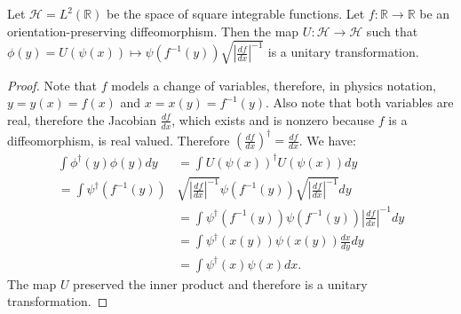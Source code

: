 \documentclass[10pt,twocolumn, nofootinbib]{revtex4-2}
\begin{document}
\begin{prop}
	Let $\mathcal{H} = L^2(\mathbb{R})$ be the space of square integrable functions. Let $f : \mathbb{R} \to \mathbb{R}$ be an orientation-preserving diffeomorphism. Then the map $U : \mathcal{H} \to \mathcal{H}$ such that 
	$\phi(y) = U(\psi(x)) \mapsto \psi(f^{-1}(y)) \sqrt{\left|\frac{df}{dx}\right|^{-1}}$ is a unitary transformation.
\end{prop}
\begin{proof}
	Note that $f$ models a change of variables, therefore, in physics notation, $y = y(x) = f(x)$ and $x = x(y) = f^{-1}(y)$. Also note that both variables are real, therefore the Jacobian $\frac{df}{dx}$, which exists and  is nonzero because $f$ is a diffeomorphism, is real valued. Therefore $\left(\frac{df}{dx}\right)^\dagger = \frac{df}{dx}$. We have:
	\begin{equation}
		\begin{aligned}
			\int \phi^\dagger(y) \phi(y) dy &= \int U(\psi(x))^\dagger U(\psi(x)) dy \\
			 = \int \psi^\dagger(f^{-1}(y)) &\sqrt{\left|\frac{df}{dx}\right|^{-1}}\psi(f^{-1}(y)) \sqrt{\left|\frac{df}{dx}\right|^{-1}} dy \\
			 &= \int \psi^\dagger(f^{-1}(y)) \psi(f^{-1}(y)) \left|\frac{df}{dx}\right|^{-1} dy \\
			 &= \int \psi^\dagger(x(y)) \psi(x(y)) \frac{dx}{dy} dy \\
			 &= \int \psi^\dagger(x) \psi(x) dx.
		\end{aligned}
	\end{equation}
	The map $U$ preserved the inner product and therefore is a unitary transformation.
\end{proof}
\end{document}
